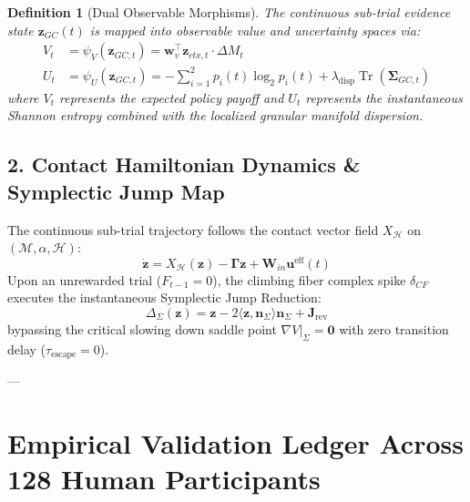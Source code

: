 \documentclass[11pt,a4paper]{article}
\newtheorem{definition}{Definition}
\begin{document}
\begin{definition}[Dual Observable Morphisms]
The continuous sub-trial evidence state $\mathbf{z}_{GC}(t)$ is mapped into observable value and uncertainty spaces via:
\begin{align}
V_t &= \psi_V(\mathbf{z}_{GC,t}) = \mathbf{w}_v^\top \mathbf{z}_{ctx,t} \cdot \Delta M_t \\
U_t &= \psi_U(\mathbf{z}_{GC,t}) = -\sum_{i=1}^2 p_i(t) \log_2 p_i(t) + \lambda_{\text{disp}} \operatorname{Tr}(\mathbf{\Sigma}_{GC,t})
\end{align}
where $V_t$ represents the expected policy payoff and $U_t$ represents the instantaneous Shannon entropy combined with the localized granular manifold dispersion.
\end{definition}

\subsection{2. Contact Hamiltonian Dynamics \& Symplectic Jump Map}
The continuous sub-trial trajectory follows the contact vector field $X_{\mathcal{H}}$ on $(\mathcal{M}, \alpha, \mathcal{H})$:
\begin{equation}
\dot{\mathbf{z}} = X_{\mathcal{H}}(\mathbf{z}) - \mathbf{\Gamma} \mathbf{z} + \mathbf{W}_{in} \mathbf{u}^{\text{eff}}(t)
\end{equation}
Upon an unrewarded trial ($F_{t-1} = 0$), the climbing fiber complex spike $\delta_{CF}$ executes the instantaneous Symplectic Jump Reduction:
\begin{equation}
\Delta_\Sigma(\mathbf{z}) = \mathbf{z} - 2\langle \mathbf{z}, \mathbf{n}_\Sigma \rangle \mathbf{n}_\Sigma + \mathbf{J}_{\text{rev}}
\end{equation}
bypassing the critical slowing down saddle point $\nabla V|_\Sigma = \mathbf{0}$ with zero transition delay ($\tau_{\text{escape}} = 0$).

---

\section{Empirical Validation Ledger Across 128 Human Participants}
\end{document}
